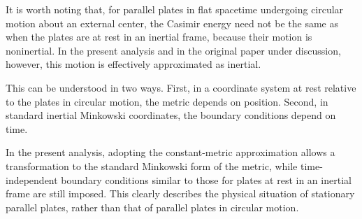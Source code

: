 It is worth noting that, for parallel plates in flat spacetime undergoing circular motion about an external center, the Casimir energy need not be the same as when the plates are at rest in an inertial frame, because their motion is noninertial. In the present analysis and in the original paper under discussion, however, this motion is effectively approximated as inertial.

This can be understood in two ways. First, in a coordinate system at rest relative to the plates in circular motion, the metric depends on position. Second, in standard inertial Minkowski coordinates, the boundary conditions depend on time.

In the present analysis, adopting the constant-metric approximation allows a transformation to the standard Minkowski form of the metric, while time-independent boundary conditions similar to those for plates at rest in an inertial frame are still imposed. This clearly describes the physical situation of stationary parallel plates, rather than that of parallel plates in circular motion.

\nocite{*}




